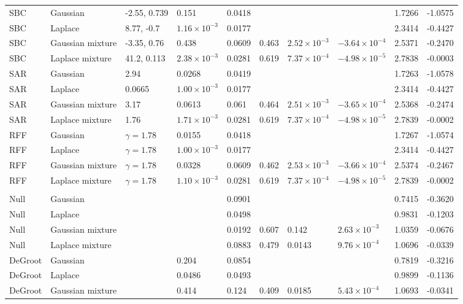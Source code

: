 \begin{longtable}{llllllllrr}
SBC & Gaussian & -2.55, 0.739 & 0.151 & 0.0418 &  &  &  & 1.7266 & -1.0575 \\
SBC & Laplace & 8.77, -0.7 & $1.16\times10^{-3}$ & 0.0177 &  &  &  & 2.3414 & -0.4427 \\
SBC & Gaussian mixture & -3.35, 0.76 & 0.438 & 0.0609 & 0.463 & $2.52\times10^{-3}$ & $-3.64\times10^{-4}$ & 2.5371 & -0.2470 \\
SBC & Laplace mixture & 41.2, 0.113 & $2.38\times10^{-3}$ & 0.0281 & 0.619 & $7.37\times10^{-4}$ & $-4.98\times10^{-5}$ & 2.7838 & -0.0003 \\
SAR & Gaussian & 2.94 & 0.0268 & 0.0419 &  &  &  & 1.7263 & -1.0578 \\
SAR & Laplace & 0.0665 & $1.00\times10^{-3}$ & 0.0177 &  &  &  & 2.3414 & -0.4427 \\
SAR & Gaussian mixture & 3.17 & 0.0613 & 0.061 & 0.464 & $2.51\times10^{-3}$ & $-3.65\times10^{-4}$ & 2.5368 & -0.2474 \\
SAR & Laplace mixture & 1.76 & $1.71\times10^{-3}$ & 0.0281 & 0.619 & $7.37\times10^{-4}$ & $-4.98\times10^{-5}$ & 2.7839 & -0.0002 \\
RFF & Gaussian & $\gamma=1.78$ & 0.0155 & 0.0418 &  &  &  & 1.7267 & -1.0574 \\
RFF & Laplace & $\gamma=1.78$ & $1.00\times10^{-3}$ & 0.0177 &  &  &  & 2.3414 & -0.4427 \\
RFF & Gaussian mixture & $\gamma=1.78$ & 0.0328 & 0.0609 & 0.462 & $2.53\times10^{-3}$ & $-3.66\times10^{-4}$ & 2.5374 & -0.2467 \\
RFF & Laplace mixture & $\gamma=1.78$ & $1.10\times10^{-3}$ & 0.0281 & 0.619 & $7.37\times10^{-4}$ & $-4.98\times10^{-5}$ & 2.7839 & -0.0002 \\
\midrule
\multicolumn{10}{l}{\markets{}} \\
Null & Gaussian &  &  & 0.0901 &  &  &  & 0.7415 & -0.3620 \\
Null & Laplace &  &  & 0.0498 &  &  &  & 0.9831 & -0.1203 \\
Null & Gaussian mixture &  &  & 0.0192 & 0.607 & 0.142 & $2.63\times10^{-3}$ & 1.0359 & -0.0676 \\
Null & Laplace mixture &  &  & 0.0883 & 0.479 & 0.0143 & $9.76\times10^{-4}$ & 1.0696 & -0.0339 \\
DeGroot & Gaussian &  & 0.204 & 0.0854 &  &  &  & 0.7819 & -0.3216 \\
DeGroot & Laplace &  & 0.0486 & 0.0493 &  &  &  & 0.9899 & -0.1136 \\
DeGroot & Gaussian mixture &  & 0.414 & 0.124 & 0.409 & 0.0185 & $5.43\times10^{-4}$ & 1.0693 & -0.0341 \\

\end{longtable}

